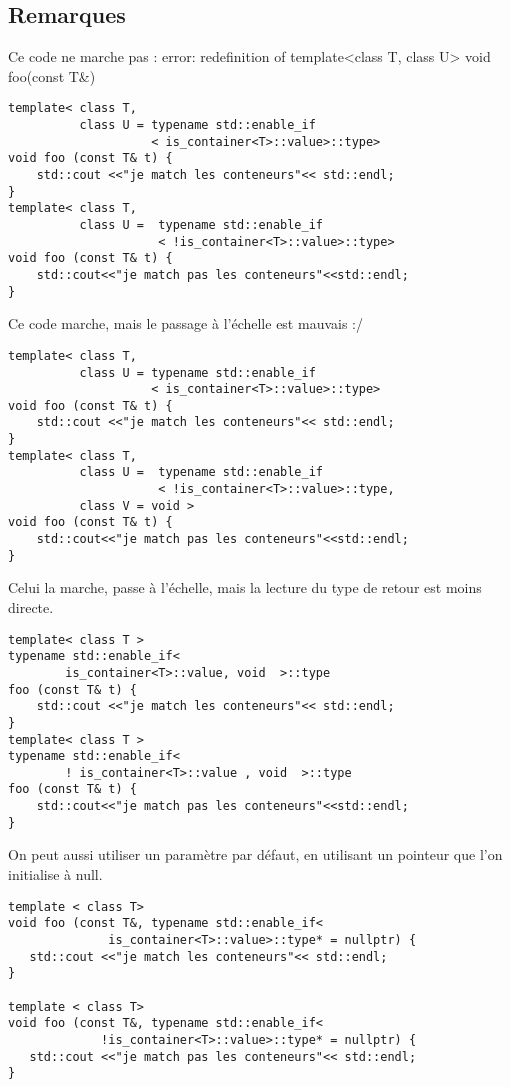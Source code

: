\documentclass{beamer}
\begin{document}
\subsection{Remarques}
\begin{frame}[containsverbatim]
	Ce code ne marche pas : error: redefinition of template<class T, class U> void foo(const T\&)
	\begin{lstlisting}
template< class T,
          class U = typename std::enable_if
                    < is_container<T>::value>::type>
void foo (const T& t) {
    std::cout <<"je match les conteneurs"<< std::endl;
}
template< class T, 
          class U =  typename std::enable_if
                     < !is_container<T>::value>::type>
void foo (const T& t) {
    std::cout<<"je match pas les conteneurs"<<std::endl;
}
	\end{lstlisting}
\end{frame}
\begin{frame}[containsverbatim]
	Ce code marche, mais le passage à l’échelle est mauvais :/
	\begin{lstlisting}
template< class T,
          class U = typename std::enable_if
                    < is_container<T>::value>::type>
void foo (const T& t) {
    std::cout <<"je match les conteneurs"<< std::endl;
}
template< class T, 
          class U =  typename std::enable_if
                     < !is_container<T>::value>::type,
          class V = void >
void foo (const T& t) {
    std::cout<<"je match pas les conteneurs"<<std::endl;
}
	\end{lstlisting}
\end{frame}
\begin{frame}[containsverbatim]
	Celui la marche, passe à l’échelle, mais la lecture du type de retour est moins directe. 
	\begin{lstlisting}
template< class T >
typename std::enable_if< 
        is_container<T>::value, void  >::type
foo (const T& t) {
    std::cout <<"je match les conteneurs"<< std::endl;
}
template< class T >
typename std::enable_if< 
        ! is_container<T>::value , void  >::type  
foo (const T& t) {
    std::cout<<"je match pas les conteneurs"<<std::endl;
}
	\end{lstlisting}

\end{frame}
\begin{frame}[containsverbatim]
	On peut aussi utiliser un paramètre par défaut, en utilisant un pointeur que l'on initialise à null.
	\begin{lstlisting}
template < class T>
void foo (const T&, typename std::enable_if<
              is_container<T>::value>::type* = nullptr) {
   std::cout <<"je match les conteneurs"<< std::endl;
}

template < class T>
void foo (const T&, typename std::enable_if<
             !is_container<T>::value>::type* = nullptr) {
   std::cout <<"je match pas les conteneurs"<< std::endl;
}
	\end{lstlisting}

\end{frame}
\end{document}
